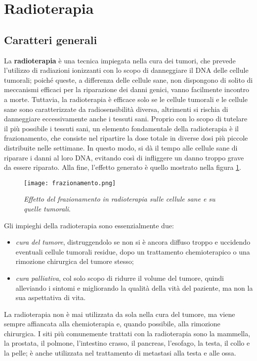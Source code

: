 \documentclass{report}
\newcommand{\figref}[1]{figura \ref{#1}}
\numberwithin{equation}{section}
\numberwithin{figure}{section}
\begin{document}
\section{Radioterapia}

\subsection{Caratteri generali}
La \textbf{radioterapia} è una tecnica impiegata nella cura dei tumori, che prevede l'utilizzo di radiazioni ionizzanti con lo scopo di danneggiare il DNA delle cellule tumorali; poiché queste, a differenza delle cellule sane, non dispongono di solito di meccanismi efficaci per la riparazione dei danni genici, vanno facilmente incontro a morte. Tuttavia, la radioterapia è efficace solo se le cellule tumorali e le cellule sane sono caratterizzate da radiosensibilità diversa, altrimenti si rischia di danneggiare eccessivamente anche i tessuti sani. Proprio con lo scopo di tutelare il più possibile i tessuti sani, un elemento fondamentale della radioterapia è il frazionamento, che consiste nel ripartire la dose totale in diverse dosi più piccole distribuite nelle settimane. In questo modo, si dà il tempo alle cellule sane di riparare i danni al loro DNA, evitando così di infliggere un danno troppo grave da essere riparato. Alla fine, l'effetto generato è quello mostrato nella \figref{fig:frazionamento}.

\begin{figure}[htp]
\centering
\texttt{[image: frazionamento.png]}
\caption{\label{fig:frazionamento} \textit{Effetto del frazionamento in radioterapia sulle cellule sane e su quelle tumorali}.}
\end{figure}

\noindent Gli impieghi della radioterapia sono essenzialmente due:
\begin{itemize}[label=$-$]
    \item \emph{cura del tumore}, distruggendolo se non si è ancora diffuso troppo e uccidendo eventuali cellule tumorali residue, dopo un trattamento chemioterapico o una rimozione chirurgica del tumore stesso;
    \item \emph{cura palliativa}, col solo scopo di ridurre il volume del tumore, quindi alleviando i sintomi e migliorando la qualità della vità del paziente, ma non la sua aspettativa di vita.
\end{itemize}
La radioterapia non è mai utilizzata da sola nella cura del tumore, ma viene sempre affiancata alla chemioterapia e, quando possibile, alla rimozione chirurgica. I siti più comunemente trattati con la radioterapia sono la mammella, la prostata, il polmone, l'intestino crasso, il pancreas, l'esofago, la testa, il collo e la pelle; è anche utilizzata nel trattamento di metastasi alla testa e alle ossa.
\end{document}
